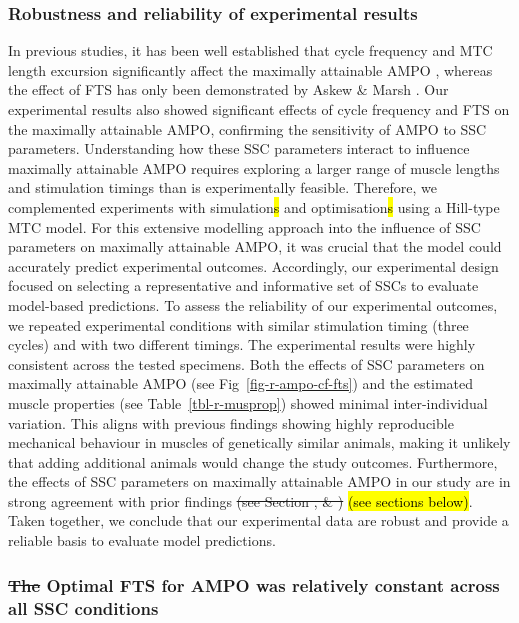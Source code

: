 \documentclass[
  10pt,
  letterpaper,
]{article}
\begin{document}
\subsubsection{Robustness and reliability of experimental
results}\label{robustness-and-reliability-of-experimental-results}

In previous studies, it has been well established that cycle frequency
and MTC length excursion significantly affect the maximally attainable
AMPO
\citep[e.g.][]{altringham_modelling_1990, askew_effects_1997, askew_optimal_1998, caiozzo_determinants_1997, james_mechanical_1995, james_isometric_1996},
whereas the effect of FTS has only been demonstrated by Askew \& Marsh
{\citep{askew_effects_1997, askew_optimal_1998}}. Our experimental
results also showed significant effects of cycle frequency and FTS on
the maximally attainable AMPO, confirming the sensitivity of AMPO to SSC
parameters. Understanding how these SSC parameters interact to influence
maximally attainable AMPO requires exploring a larger range of muscle
lengths and stimulation timings than is experimentally feasible.
Therefore, we complemented experiments with simulation\hl{s} and
optimisation\hl{s} using a Hill-type MTC model. For this extensive
modelling approach into the influence of SSC parameters on maximally
attainable AMPO, it was crucial that the model could accurately predict
experimental outcomes. Accordingly, our experimental design focused on
selecting a representative and informative set of SSCs to evaluate
model-based predictions. To assess the reliability of our experimental
outcomes, we repeated experimental conditions with similar stimulation
timing (three cycles) and with two different timings. The experimental
results were highly consistent across the tested specimens. Both the
effects of SSC parameters on maximally attainable AMPO (see
Fig~\ref{fig-r-ampo-cf-fts}) and the estimated muscle properties (see
Table~\ref{tbl-r-musprop}) showed minimal inter-individual variation.
This aligns with previous findings showing highly reproducible
mechanical behaviour in muscles of genetically similar animals, making
it unlikely that adding additional animals would change the study
outcomes. Furthermore, the effects of SSC parameters on maximally
attainable AMPO in our study are in strong agreement with prior findings
\st{(see Section , \& )} \hl{(see sections below)}. Taken together, we
conclude that our experimental data are robust and provide a reliable
basis to evaluate model predictions.

\subsubsection{\texorpdfstring{\st{The} Optimal FTS for AMPO was
relatively constant across all SSC
conditions}{The Optimal FTS for AMPO was relatively constant across all SSC conditions}}\label{the-optimal-fts-for-ampo-was-relatively-constant-across-all-ssc-conditions}
\end{document}

